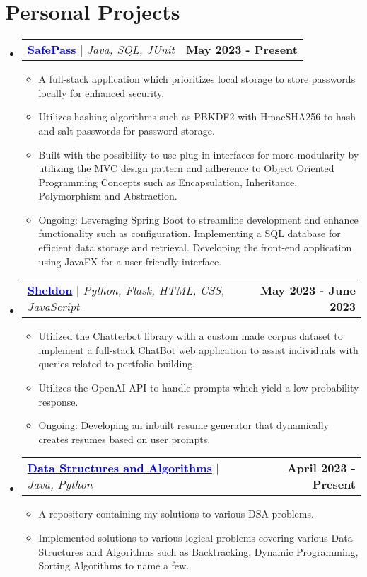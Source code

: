 \documentclass[letterpaper,11pt]{article}
\makeatletter
\newcommand{\resumeItem}[1]{
  \item\small{
    {#1 \vspace{-2pt}}
  }
}
\newcommand{\resumeProjectHeading}[2]{
    \item
    \begin{tabular*}{1.001\textwidth}{l@{\extracolsep{\fill}}r}
      \small#1 & \textbf{\small #2}\\
    \end{tabular*}\vspace{-7pt}
}
\newcommand{\resumeSubHeadingListStart}{\begin{itemize}[leftmargin=0.0in, label={}]}
\newcommand{\resumeSubHeadingListEnd}{\end{itemize}}
\newcommand{\resumeItemListStart}{\begin{itemize}}
\newcommand{\resumeItemListEnd}{\end{itemize}\vspace{-5pt}}
\makeatother
\begin{document}
\section{Personal Projects}
    \vspace{-5pt}
    \resumeSubHeadingListStart
      \resumeProjectHeading
          {\href{https://github.com/ShevinuM/SafePass}{\textcolor{blue}{\textbf{SafePass}}} $|$ \emph{Java, SQL, JUnit}}{May 2023 - Present}
          \resumeItemListStart
            \resumeItem{A full-stack application which prioritizes local storage to store passwords locally for enhanced security.}
            \resumeItem{Utilizes hashing algorithms such as PBKDF2 with HmacSHA256 to hash and salt passwords for password storage.}
            \resumeItem{Built with the possibility to use plug-in interfaces for more modularity by utilizing the MVC design pattern and adherence to Object Oriented Programming Concepts such as Encapsulation, Inheritance, Polymorphism and Abstraction.}
            \resumeItem{Ongoing: Leveraging Spring Boot to streamline development and enhance functionality such as configuration. Implementing a SQL database for efficient data storage and retrieval. Developing the front-end application using JavaFX for a user-friendly interface.}
          \resumeItemListEnd
          \vspace{-13pt}
      \resumeProjectHeading
          {\href{https://github.com/ShevinuM/Sheldon}{\textcolor{blue}{\textbf{Sheldon}}} $|$ \emph{Python, Flask, HTML, CSS, JavaScript}}{May 2023 - June 2023}
          \resumeItemListStart
            \resumeItem{Utilized the Chatterbot library with a custom made corpus dataset to implement a full-stack ChatBot web application to assist individuals with queries related to portfolio building.}
            \resumeItem{Utilizes the OpenAI API to handle prompts which yield a low probability response.}
            \resumeItem{Ongoing: Developing an inbuilt resume generator that dynamically creates resumes based on user prompts.}
          \resumeItemListEnd 
          \vspace{-13pt}
          \resumeProjectHeading
          {\href{https://github.com/ShevinuM/Data-Structures-And-Algorithms}{\textcolor{blue}{\textbf{Data Structures and Algorithms}}} $|$ \emph{Java, Python}}{April 2023 - Present}
          \resumeItemListStart
            \resumeItem{A repository containing my solutions to various DSA problems.}
            \resumeItem{Implemented solutions to various logical problems covering various Data Structures and Algorithms such as Backtracking, Dynamic Programming, Sorting Algorithms to name a few.}
          \resumeItemListEnd 
    \resumeSubHeadingListEnd
\vspace{-15pt}
\end{document}
